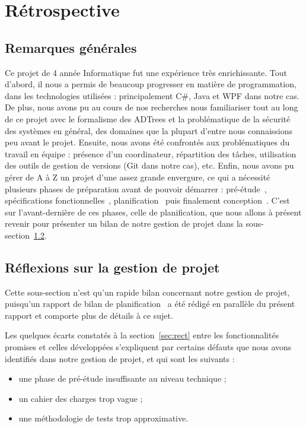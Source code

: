 \section{Rétrospective}
\label{sec:retro}

\subsection{Remarques générales}
\label{ssec:rq_gen}

Ce projet de 4\ieme{} année Informatique fut une expérience très enrichissante. Tout d'abord, il nous a permis de beaucoup progresser en matière de programmation, dans les technologies utilisées : principalement C\#, Java et WPF dans notre cas. De plus, nous avons pu au cours de nos recherches nous familiariser tout au long de ce projet avec le formalisme des ADTrees et la problématique de la sécurité des systèmes en général, des domaines que la plupart d'entre nous connaissions peu avant le projet. Ensuite, nous avons été confrontés aux problématiques du travail en équipe : présence d'un coordinateur, répartition des tâches, utilisation des outils de gestion de versions (Git dans notre cas), etc. Enfin, nous avons pu gérer de A à Z un projet d'une assez grande envergure, ce qui a nécessité plusieurs phases de préparation avant de pouvoir démarrer : pré-étude~\cite{pre_etude}, spécifications fonctionnelles~\cite{spec_fonc}, planification~\cite{planif} puis finalement conception~\cite{conception}. C'est sur l'avant-dernière de ces phases, celle de planification, que nous allons à présent revenir pour présenter un bilan de notre gestion de projet dans la {\sc sous-section}~\ref{ssec:gestionProjet}.

\subsection{Réflexions sur la gestion de projet}
\label{ssec:gestionProjet}

Cette sous-section n'est qu'un rapide bilan concernant notre gestion de projet, puisqu'un rapport de bilan de planification~\cite{bilanPlanif} a été rédigé en parallèle du présent rapport et comporte plus de détails à ce sujet.

Les quelques écarts constatés à la {\sc section}~\ref{sec:rect} entre les fonctionnalités promises et celles développées s'expliquent par certains défauts que nous avons identifiés dans notre gestion de projet, et qui sont les suivants : 

\begin{itemize}
\item une phase de pré-étude insuffisante au niveau technique ;
\item un cahier des charges trop vague ;
\item une méthodologie de tests trop approximative.
\end{itemize}


